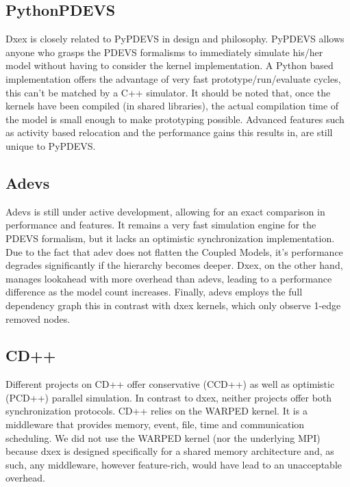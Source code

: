 \subsection{PythonPDEVS}
Dxex is closely related to PyPDEVS in design and philosophy. PyPDEVS allows anyone who grasps the PDEVS formalisms to immediately simulate his/her model without having to consider the kernel implementation. A Python based implementation offers the advantage of very fast prototype/run/evaluate cycles, this can't be matched by a C++ simulator. It should be noted that, once the kernels have been compiled (in shared libraries), the actual compilation time of the model is small enough to make prototyping possible.
Advanced features such as activity based relocation and the performance gains this results in, are still unique to PyPDEVS.
\subsection{Adevs}
Adevs is still under active development, allowing for an exact comparison in performance and features. It remains a very fast simulation engine for the PDEVS formalism, but it lacks an optimistic synchronization implementation. %
Due to the fact that adev does not flatten the Coupled Models, it's performance degrades significantly if the hierarchy becomes deeper. Dxex, on the other hand, manages lookahead with more overhead than adevs, leading to a performance difference as the model count increases. Finally, adevs employs the full dependency graph this in contrast with dxex kernels, which only observe 1-edge removed nodes. 
\subsection{CD++}
Different projects on CD++ offer conservative (CCD++) as well as optimistic (PCD++) parallel simulation. In contrast to dxex,  neither projects offer both synchronization protocols. CD++ relies on the WARPED kernel. It is a middleware that provides memory, event, file, time and communication scheduling. We did not use the WARPED kernel (nor the underlying MPI) because dxex is designed specifically for a shared memory architecture and, as such, any middleware, however feature-rich, would have lead to an unacceptable overhead.
